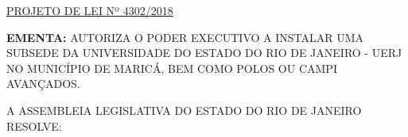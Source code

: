 \documentclass[10pt]{article}
\date{}
\begin{document}
\maketitle
\begin{center}
  \huge
  \vspace{-3cm}\href{http://alerjln1.alerj.rj.gov.br/scpro1519.nsf/f4b46b3cdbba990083256cc900746cf6/0b3199ecaeb73e69832582e4006c71c6?OpenDocument}{PROJETO DE LEI Nº 4302/2018}
\bigskip
\bigskip
\bigskip
  
\end{center}

\textbf{EMENTA:} 
AUTORIZA O PODER EXECUTIVO A INSTALAR UMA SUBSEDE DA UNIVERSIDADE DO ESTADO DO RIO DE JANEIRO - UERJ NO MUNICÍPIO DE MARICÁ, BEM COMO POLOS OU CAMPI AVANÇADOS.








\bigskip

\noindent
A ASSEMBLEIA LEGISLATIVA DO ESTADO DO RIO DE JANEIRO RESOLVE:
\end{document}
